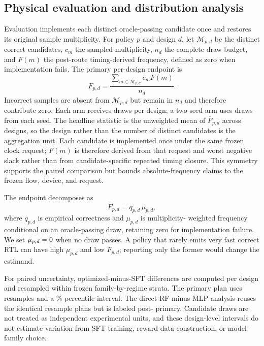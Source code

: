 \subsection{Physical evaluation and distribution analysis}

Evaluation implements each distinct oracle-passing candidate once and restores
its original sample multiplicity.  For policy $p$ and design $d$,
let $\mathcal{M}_{p,d}$ be the distinct correct candidates, $c_m$ the sampled
multiplicity, $n_d$ the complete draw budget, and $F(m)$ the post-route
timing-derived frequency, defined as zero when implementation fails.  The
primary per-design endpoint is
\begin{equation}
\overline{F}_{p,d}=\frac{\sum_{m\in\mathcal{M}_{p,d}}c_mF(m)}{n_d}.
\label{eq:equal-sample}
\end{equation}
Incorrect samples are absent from $\mathcal{M}_{p,d}$ but remain in $n_d$ and
therefore contribute zero.  Each arm receives
 draws per design; a two-seed arm uses
 draws from each seed.  The headline
statistic is the unweighted mean of $\overline{F}_{p,d}$ across designs, so the
design rather than the number of distinct candidates is the aggregation unit.
Each candidate is implemented once under the same frozen clock request; $F(m)$
is therefore derived from that request and worst negative slack rather than
from candidate-specific repeated timing closure.  This symmetry supports the
paired comparison but bounds absolute-frequency claims to the frozen flow,
device, and request.

The endpoint decomposes as
\begin{equation}
\overline{F}_{p,d}=q_{p,d}\,\mu_{p,d},
\label{eq:decomposition}
\end{equation}
where $q_{p,d}$ is empirical correctness and $\mu_{p,d}$ is multiplicity-
weighted frequency conditional on an oracle-passing draw, retaining zero for
implementation failure.  We set $\mu_{p,d}=0$ when no draw passes.  A policy
that rarely emits very fast correct RTL can have high $\mu_{p,d}$ and low
$\overline{F}_{p,d}$; reporting only the former would change the estimand.

For paired uncertainty, optimized-minus-SFT differences are computed per
design and resampled within frozen family-by-regime strata.  The primary plan
uses  resamples and a
\% percentile interval.  The direct
RF-minus-MLP analysis reuses the identical resample plans but is labeled post-
primary.  Candidate draws are not treated as independent experimental units,
and these design-level intervals do not estimate variation from SFT training,
reward-data construction, or model-family choice.



